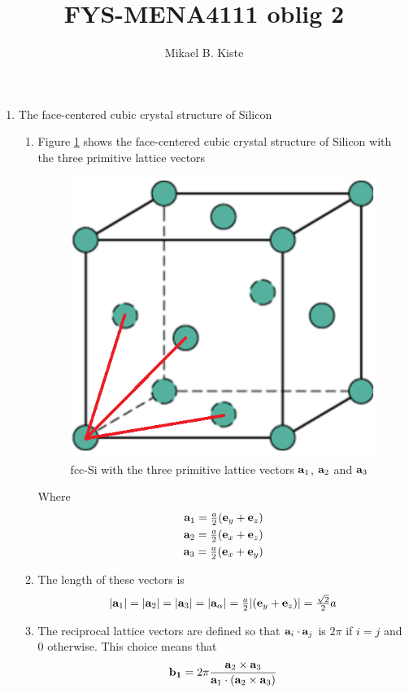 \documentclass[12pt,a4paper]{article}
\author{Mikael B. Kiste}
\title{FYS-MENA4111 oblig 2}
\begin{document}
	\maketitle
	\begin{enumerate}
		\item The face-centered cubic crystal structure of Silicon
		\begin{enumerate}
			\item Figure \ref{fig:fccvec} shows the face-centered cubic crystal structure of Silicon with the three primitive lattice vectors
			\begin{figure}[h]
				\centering
				\includegraphics[width=0.7\linewidth]{fccVec}
				\caption{fcc-Si with the three primitive lattice vectors $\vb{a}_1$, $\vb{a}_2$ and $\vb{a}_3$}
				\label{fig:fccvec}
			\end{figure}
			Where
			\begin{align*}
				\vb{a}_1 = \tfrac{a}{2}(\vb{e}_y+\vb{e}_z)\\
				\vb{a}_2 = \tfrac{a}{2}(\vb{e}_x+\vb{e}_z)\\
				\vb{a}_3 = \tfrac{a}{2}(\vb{e}_x+\vb{e}_y)
			\end{align*}
			\item The length of these vectors is
			\begin{align*}
				\abs{\vb{a}_1} = \abs{\vb{a}_2} = \abs{\vb{a}_3} = \abs{\vb{a}_\alpha} = \tfrac{a}{2}\abs{(\vb{e}_y+\vb{e}_z)} = \tfrac{\sqrt{2}}{2}a
			\end{align*}
			\item The reciprocal lattice vectors are defined so that $\vb{a}_i\cdot \vb{a}_j$ is $2\pi$ if $i=j$ and 0 otherwise. This choice means that
			\begin{align*}
				\vb{b_1} = 2\pi \frac{\vb{a}_2\times \vb{a}_3}{\vb{a}_1\cdot (\vb{a}_2\times\vb{a}_3)}\\

\end{align*}
\end{enumerate}
\end{enumerate}
\end{document}
